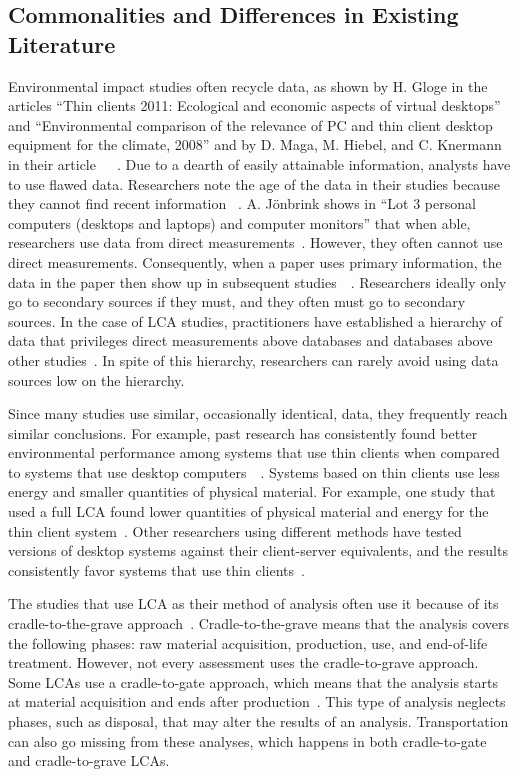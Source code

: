 \documentclass[final,journal,10pt,letterpaper,oneside,twocolumn,compsoc]%
{IEEEtran}
\begin{document}
\subsection{Commonalities and Differences in Existing Literature}
Environmental
impact studies often recycle data, as shown by H. Gloge in the articles ``Thin
clients 2011: Ecological and economic
aspects of virtual desktops'' and ``Environmental comparison of the relevance
of PC and thin client desktop equipment for the climate, 2008'' and by D. Maga,
M. Hiebel, and C. Knermann in their article~\cite{client}~\cite{desktop2}~\cite{maga}. Due to a dearth of easily attainable information, analysts have to
use flawed data. Researchers note the age of the data in
their studies because they cannot find recent information~\cite{maga}
\cite{client}. A. J{\"o}nbrink shows in ``Lot 3 personal computers
(desktops
and laptops) and computer monitors'' that when able, researchers use data from
direct measurements~\cite{desktop}. However, they often cannot use direct measurements.
Consequently,
when a paper uses primary information, the data in the paper then show up
in subsequent studies~\cite{maga}~\cite{desktop2}. Researchers ideally only
go to secondary sources if they must, and they often must go to secondary
sources. In the case of LCA studies,
practitioners have established a
hierarchy of data that privileges direct measurements above databases and
databases above other studies~\cite{textbook}. In spite of this hierarchy,
researchers can rarely avoid using data sources low on the hierarchy.

Since many studies use similar, occasionally identical, data, they
frequently reach similar conclusions. For example, past research has
consistently
found better environmental performance among systems that use thin clients when
compared to systems that use desktop computers~\cite{maga}~\cite{desktop2}.
Systems based on thin clients use less energy and smaller quantities of physical
material. For example, one study that used a full LCA found
lower quantities of physical material and energy for the thin client system~\cite{maga}.
Other researchers using different methods have tested versions of desktop
systems against
their client-server equivalents, and the results consistently favor
systems that use thin clients~\cite{client}.

The studies that use LCA as their method of analysis often use it because of its
cradle-to-the-grave approach~\cite{14044}. Cradle-to-the-grave means that the
analysis covers the following phases: raw material acquisition, production, use,
and end-of-life treatment. However, not every assessment uses the
cradle-to-grave approach. Some LCAs use a cradle-to-gate approach, which means
that the
analysis starts at material acquisition and ends after production~\cite{14040}.
This type of analysis neglects phases, such as disposal, that may alter the
results of an analysis. Transportation can also go missing from these analyses,
which happens in both cradle-to-gate and cradle-to-grave LCAs.
\end{document}
